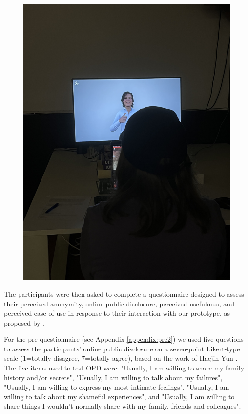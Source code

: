 \begin{figure}[!htb]
\begin{minipage}{0.49\textwidth}
        \includegraphics[width=0.9\linewidth]{figures/userTesting.jpg}
        \label{fig:userTesting}
    \end{minipage}
\end{figure}

The participants were then asked to complete a questionnaire designed to assess their perceived anonymity, online public disclosure, perceived usefulness, and perceived ease of use in response to their interaction with our prototype, as proposed by \cite{YUN06, HIT14}.

For the pre questionnaire (see Appendix \ref{appendix:pre2}) we used five questions to assess the participants' online public disclosure on a seven-point Likert-type scale (1=totally disagree, 7=totally agree), based on the work of Haejin Yun \cite{YUN06}. The five items used to test OPD were: "Usually, I am willing to share my family history and/or secrets", "Usually, I am willing to talk about my failures", "Usually, I am willing to express my most intimate feelings", "Usually, I am willing to talk about my shameful experiences", and "Usually, I am willing to share things I wouldn’t normally share with my family, friends and colleagues".

